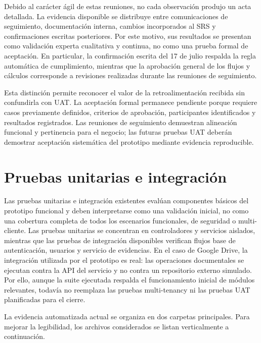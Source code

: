 \documentclass[final]{udpthesis}
\begin{document}
Debido al carácter ágil de estas reuniones, no cada observación produjo un acta detallada. La evidencia disponible se distribuye entre comunicaciones de seguimiento, documentación interna, cambios incorporados al SRS y confirmaciones escritas posteriores. Por este motivo, sus resultados se presentan como validación experta cualitativa y continua, no como una prueba formal de aceptación. En particular, la confirmación escrita del 17 de julio respalda la regla automática de cumplimiento, mientras que la aprobación general de los flujos y cálculos corresponde a revisiones realizadas durante las reuniones de seguimiento.

Esta distinción permite reconocer el valor de la retroalimentación recibida sin confundirla con UAT. La aceptación formal permanece pendiente porque requiere casos previamente definidos, criterios de aprobación, participantes identificados y resultados registrados. Las reuniones de seguimiento demuestran alineación funcional y pertinencia para el negocio; las futuras pruebas UAT deberán demostrar aceptación sistemática del prototipo mediante evidencia reproducible.

\section{Pruebas unitarias e integración}

Las pruebas unitarias e integración existentes evalúan componentes básicos del prototipo funcional y deben interpretarse como una validación inicial, no como una cobertura completa de todos los escenarios funcionales, de seguridad o multi-cliente. Las pruebas unitarias se concentran en controladores y servicios aislados, mientras que las pruebas de integración disponibles verifican flujos base de autenticación, usuarios y servicio de evidencias. En el caso de Google Drive, la integración utilizada por el prototipo es real: las operaciones documentales se ejecutan contra la API del servicio y no contra un repositorio externo simulado. Por ello, aunque la suite ejecutada respalda el funcionamiento inicial de módulos relevantes, todavía no reemplaza las pruebas multi-tenancy ni las pruebas UAT planificadas para el cierre.

La evidencia automatizada actual se organiza en dos carpetas principales. Para mejorar la legibilidad, los archivos considerados se listan verticalmente a continuación.
\end{document}
